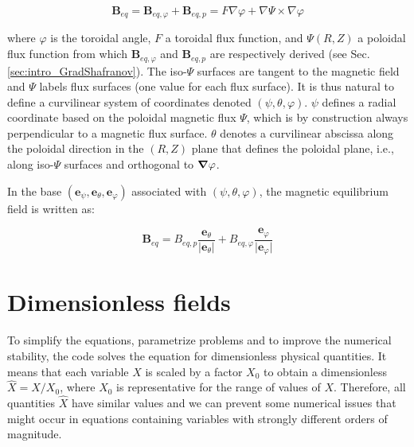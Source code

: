 \begin{equation}
	\mathbf{B}_{eq} = \mathbf{B}_{eq,\varphi} + \mathbf{B}_{eq,p} = F \nabla{\varphi} + \nabla{\Psi} \times \nabla{\varphi}
\end{equation}

where $\varphi$ is the toroidal angle, $F$ a toroidal flux function, and $\Psi(R,Z)$ a poloidal flux function from which $\mathbf{B}_{eq,\varphi}$ and $\mathbf{B}_{eq,p}$ are respectively derived (see Sec. \ref{sec:intro_GradShafranov}). The iso-$\Psi$ surfaces are tangent to the magnetic field and $\Psi$ labels flux surfaces (one value for each flux surface). It is thus natural to define a curvilinear system of coordinates denoted $(\psi, \theta, \varphi)$. $\psi$ defines a radial coordinate based on the poloidal magnetic flux $\Psi$, which is by construction always perpendicular to a magnetic flux surface. $\theta$ denotes a curvilinear abscissa along the poloidal direction in the $(R, Z)$ plane that defines the poloidal plane, i.e., along iso-$\Psi$ surfaces and orthogonal to $\grad  \varphi$. \newline

In the base $(\boldsymbol{e}_{\psi}, \boldsymbol{e}_{\theta}, \boldsymbol{e}_{\varphi})$ associated with $(\psi, \theta, \varphi)$, the magnetic equilibrium field is written as:

\begin{equation}
	\boldsymbol{B}_{eq} = B_{eq,p} \frac{\boldsymbol{e}_{\theta}}{\vert \boldsymbol{e}_{\theta} \vert} + B_{eq,\varphi} \frac{\boldsymbol{e}_{\varphi}}{\vert \boldsymbol{e}_{\varphi} \vert}
\end{equation}



\section{Dimensionless fields}
\label{sec:S3X_referenceValues}

To simplify the equations, parametrize problems and to improve the numerical stability, the code solves the equation for dimensionless physical quantities. It means that each variable $X$ is scaled by a factor $X_0$ to obtain a dimensionless $\hat{X} = X/X_0$, where $X_0$ is representative for the range of values of $X$. Therefore, all quantities $\hat{X}$ have similar values and we can prevent some numerical issues that might occur in equations containing variables with strongly different orders of magnitude. \\

